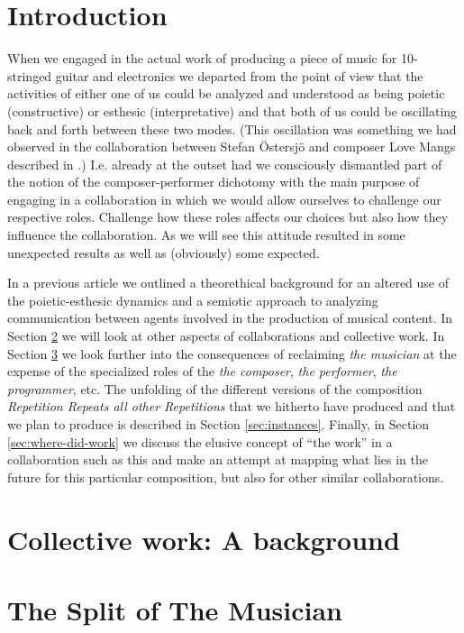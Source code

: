 
\section{Introduction}
\label{sec:introduction}

When we engaged in the actual work of producing a piece of music for
10-stringed guitar and electronics we departed from the point of view
that the activities of either one of us could be analyzed and
understood as being poietic (constructive) or esthesic
(interpretative) and that both of us could be oscillating back and
forth between these two modes. (This oscillation was something we had observed in the
collaboration between Stefan {\"O}stersj{\"o} and composer Love Mangs
described in \citet{frisk-ost06}.) I.e. already at the outset had we
consciously dismantled part of the notion of the composer-performer
dichotomy with the main purpose of engaging in a
collaboration in which we would allow ourselves to challenge our
respective roles. Challenge how these roles affects our choices but
also how they influence the collaboration. As we will see this
attitude resulted in some unexpected results as well as (obviously)
some expected.

In a previous article \citep{frisk-ost06-2} we outlined a theorethical
background for an altered use of the poietic-esthesic dynamics and a
semiotic approach to analyzing communication between agents involved
in the production of musical content. In Section
\ref{sec:coll-work:-backgr} we will look at other aspects of
collaborations and collective work. In Section
\ref{sec:split-musician} we look further into the consequences of
reclaiming \emph{the musician} at the expense of the specialized roles
of the \emph{the composer}, \emph{the performer}, \emph{the
  programmer}, etc. The unfolding of the different versions of the
composition \emph{Repetition Repeats all other Repetitions} that we
hitherto have produced and that we plan to produce is described in
Section \ref{sec:instances}. Finally, in Section
\ref{sec:where-did-work} we discuss the elusive concept of ``the
work'' in a collaboration such as this and make an attempt at mapping
what lies in the future for this particular composition, but also for
other similar collaborations.

\section{Collective work: A background}
\label{sec:coll-work:-backgr}

\section{The Split of The Musician}
\label{sec:split-musician}

